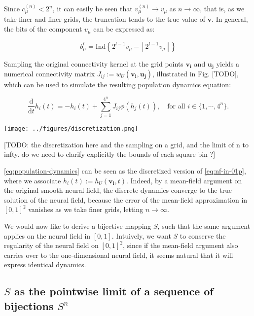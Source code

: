 \documentclass[10pt,letterpaper]{article}
\def\d{\mathrm d}
\renewcommand{\vec}[1]{\boldsymbol{#1}}
\begin{document}
Since $c_\mu^{(n)} < 2^n$, it can easily be seen that $v_\mu^{(n)} \to v_\mu$ as $n\to\infty$, that is, as we take finer and finer grids, the truncation tends to the true value of $\vec{v}$. In general, the bits of the component $v_\mu$ can be expressed as:

\begin{equation*}
b_\mu^l = \mathrm{Ind} \left\{ 2^{l-1}v_\mu - \left\lfloor 2^{l-1}v_\mu \right\rfloor \right\}
\end{equation*}

Sampling the original connectivity kernel at the grid points $\vec{v_i}$ and $\vec{u_j}$ yields a numerical connectivity matrix $J_{ij} := w_U(\vec{v_i}, \vec{u_j})$, illustrated in Fig. [TODO], which can be used to simulate the resulting population dynamics equation:

\begin{equation} \label{eq:population-dynamics}
\frac{\d}{\d t} h_i(t) = -h_i(t) + \sum_{j=1}^{4^n} J_{ij} \phi(h_j(t)), \quad \text{for all } i \in \{1,\cdots,4^n\}.
\end{equation}

\texttt{[image: ../figures/discretization.png]}

[TODO: the discretization here and the sampling on a grid, and the limit of n to infty. do we need to clarify explicitly the bounds of each square bin ?]
\endif

\autoref{eq:population-dynamics} can be seen as the discretized version of \autoref{eq:nf-in-01p}, where we associate $h_i(t) := h_U(\vec{v_i}, t)$. Indeed, by a mean-field argument on the original smooth neural field, the discrete dynamics converge to the true solution of the neural field, because the error of the mean-field approximation in $[0,1]^2$ vanishes as we take finer grids, letting $n \to \infty$.

We would now like to derive a bijective mapping $S$, such that the same argument applies on the neural field in $[0,1]$. Intuively, we want $S$ to conserve the regularity of the neural field on $[0,1]^2$, since if the mean-field argument also carries over to the one-dimensional neural field, it seems natural that it will express identical dynamics.

\subsection{$S$ as the pointwise limit of a sequence of bijections $S^n$}
\end{document}
